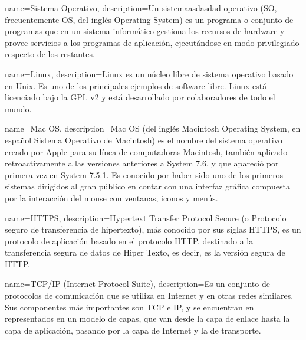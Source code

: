 {name=Sistema Operativo,
 description={Un sistemaasdasdad operativo (SO, frecuentemente OS, del inglés Operating System) es un programa o conjunto de programas que en un sistema informático gestiona los recursos de hardware y provee servicios a los programas de aplicación, ejecutándose en modo privilegiado respecto de los restantes.}
 }

{name=Linux,
 description={Linux es un núcleo libre de sistema operativo basado en Unix. Es uno de los principales ejemplos de software libre. Linux está licenciado bajo la GPL v2 y está desarrollado por colaboradores de todo el mundo.}
 }

{name=Mac OS,
 description={Mac OS (del inglés Macintosh Operating System, en español Sistema Operativo de Macintosh) es el nombre del sistema operativo creado por Apple para su línea de computadoras Macintosh, también aplicado retroactivamente a las versiones anteriores a System 7.6, y que apareció por primera vez en System 7.5.1. Es conocido por haber sido uno de los primeros sistemas dirigidos al gran público en contar con una interfaz gráfica compuesta por la interacción del mouse con ventanas, iconos y menús.}
 }

 
{name=HTTPS,
 description={Hypertext Transfer Protocol Secure (o Protocolo seguro de transferencia de hipertexto), más conocido por sus siglas HTTPS, es un protocolo de aplicación basado en el protocolo HTTP, destinado a la transferencia segura de datos de Hiper Texto, es decir, es la versión segura de HTTP.}
 }
 
{name=TCP/IP (Internet Protocol Suite),
 description={Es un conjunto de protocolos de comunicación que se utiliza en Internet y en otras redes similares. Sus componentes más importantes son TCP e IP, y se encuentran en representados en un modelo de capas, que van desde la capa de enlace hasta la capa de aplicación, pasando por la capa de Internet y la de transporte.}
}